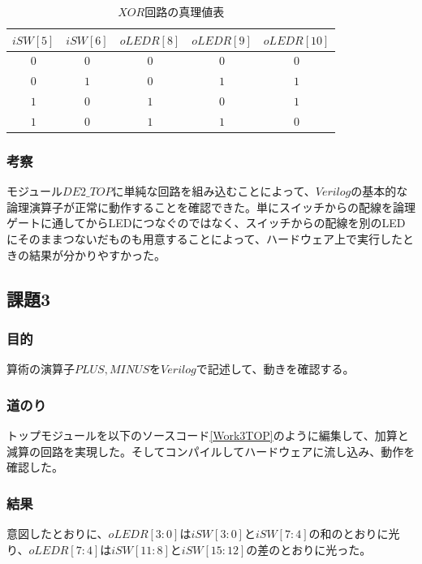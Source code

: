 \documentclass[a4paper]{jarticle}
\begin{document}
\begin{table}[!h]
	\begin{center}
		\caption{$XOR$回路の真理値表}
		\label{Work2XorGateTruthTable}
		\begin{tabular}{|c|c|c|c|c|}
			\hline
			$iSW \left[ 5 \right]$	&$iSW \left[ 6 \right]$	&$oLEDR \left[ 8 \right]$	&$oLEDR \left[ 9 \right]$	&$oLEDR \left[ 10 \right]$\\	\hline\hline
			$0$			&$0$			&$0$				&$0$				&$0$\\				\hline
			$0$			&$1$			&$0$				&$1$				&$1$\\				\hline
			$1$			&$0$			&$1$				&$0$				&$1$\\				\hline
			$1$			&$0$			&$1$				&$1$				&$0$\\				\hline
		\end{tabular}
	\end{center}
\end{table}
\subsubsection{考察}
モジュール$DE2\_TOP$に単純な回路を組み込むことによって、$Verilog$の基本的な論理演算子が正常に動作することを確認できた。単にスイッチからの配線を論理ゲートに通してからLEDにつなぐのではなく、スイッチからの配線を別のLEDにそのままつないだものも用意することによって、ハードウェア上で実行したときの結果が分かりやすかった。
\subsection{課題3}
\subsubsection{目的}
算術の演算子$PLUS,MINUS$を$Verilog$で記述して、動きを確認する。
\subsubsection{道のり}
トップモジュールを以下のソースコード\ref{Work3TOP}のように編集して、加算と減算の回路を実現した。そしてコンパイルしてハードウェアに流し込み、動作を確認した。

\subsubsection{結果}
意図したとおりに、$oLEDR[3:0]$は$iSW[3:0]$と$iSW[7:4]$の和のとおりに光り、$oLEDR[7:4]$は$iSW[11:8]$と$iSW[15:12]$の差のとおりに光った。
\end{document}
